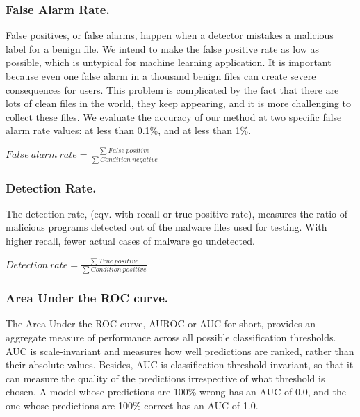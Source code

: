 \documentclass[runningheads]{llncs}
\begin{document}
\subsubsection{False Alarm Rate.}

False positives, or false alarms, happen when a detector mistakes a malicious label for a benign file. We intend to make the false positive rate as low as possible, which is untypical for machine learning application. It is important because even one false alarm in a thousand benign files can create severe consequences for users. This problem is complicated by the fact that there are lots of clean files in the world, they keep appearing, and it is more challenging to collect these files. We evaluate the accuracy of our method at two specific false alarm rate values: at less than 0.1\%, and at less than 1\%.

\begin{center}
    ${False\ alarm\ rate} =  \frac{\sum False\ positive}{\sum Condition\ negative}$
\end{center}

\subsubsection{Detection Rate.}

The detection rate, (eqv. with recall or true positive rate), measures the ratio of malicious programs detected out of the malware files used for testing. With higher recall, fewer actual cases of malware go undetected.

\begin{center}
    ${Detection\ rate} =  \frac{\sum True\ positive}{\sum Condition\ positive}$
\end{center}

\subsubsection{Area Under the ROC curve.}

The Area Under the ROC curve, AUROC or AUC for short, provides an aggregate measure of performance across all possible classification thresholds. AUC is scale-invariant and measures how well predictions are ranked, rather than their absolute values. Besides, AUC is classification-threshold-invariant, so that it can measure the quality of the predictions irrespective of what threshold is chosen. A model whose predictions are 100\% wrong has an AUC of 0.0, and the one whose predictions are 100\% correct has an AUC of 1.0.
\end{document}
